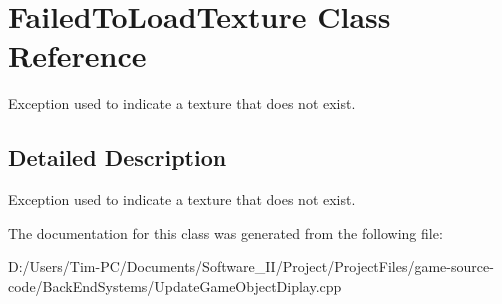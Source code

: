 \hypertarget{class_failed_to_load_texture}{}\section{Failed\+To\+Load\+Texture Class Reference}
\label{class_failed_to_load_texture}


Exception used to indicate a texture that does not exist.  




\subsection{Detailed Description}
Exception used to indicate a texture that does not exist. 

The documentation for this class was generated from the following file\+:\begin{DoxyCompactItemize}
\item 
D\+:/\+Users/\+Tim-\/\+P\+C/\+Documents/\+Software\+\_\+\+I\+I/\+Project/\+Project\+Files/game-\/source-\/code/\+Back\+End\+Systems/Update\+Game\+Object\+Diplay.\+cpp\end{DoxyCompactItemize}
